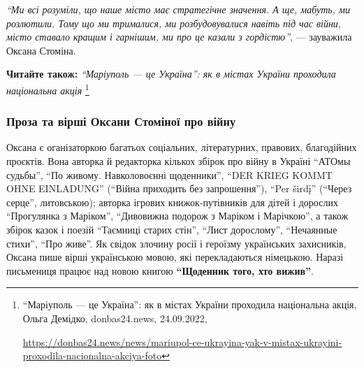 \begin{leftbar}
\emph{\enquote{Ми всі розуміли, що наше місто має стратегічне значення. А ще, мабуть, ми
розлютили. Тому що ми трималися, ми розбудовувалися навіть під час
війни, місто ставало кращим і гарнішим, ми про це казали з гордістю}}, — зауважила Оксана Стоміна.
\end{leftbar}

\textbf{Читайте також:} \emph{\enquote{Маріуполь — це Україна}: як в містах України проходила національна акція}%
\footnote{\enquote{Маріуполь — це Україна}: як в містах України проходила національна акція, Ольга Демідко, donbas24.news, 24.09.2022, \par%
\url{https://donbas24.news/news/mariupol-ce-ukrayina-yak-v-mistax-ukrayini-proxodila-nacionalna-akciya-foto}%
}


\subsubsection{Проза та вірші Оксани Стоміної про війну}

Оксана є оганізаторкою багатьох соціальних, літературних, правових, благодійних
проєктів. Вона авторка й редакторка кількох збірок про війну в Україні \enquote{АТОмы
судьбы}, \enquote{По живому. Навколовоєнні щоденники}, \enquote{DER KRIEG KOMMT OHNE EINLADUNG}
(\enquote{Війна приходить без запрошення}), \enquote{Per širdį} (\enquote{Через серце}, литовською);
авторка ігрових книжок-путівників для дітей і дорослих \enquote{Прогулянка з Маріком},
\enquote{Дивовижна подорож з Маріком і Марічкою}, а також збірок казок і поезій
\enquote{Таємниці старих стін}, \enquote{Лист дорослому}, \enquote{Нечаянные стихи}, \enquote{Про живе}. Як
свідок злочину росії і героїзму українських захисників, Оксана пише вірші
українською мовою, які перекладаються німецькою. Наразі письмениця працює над
новою книгою \textbf{\enquote{Щоденник того, хто вижив}}.

